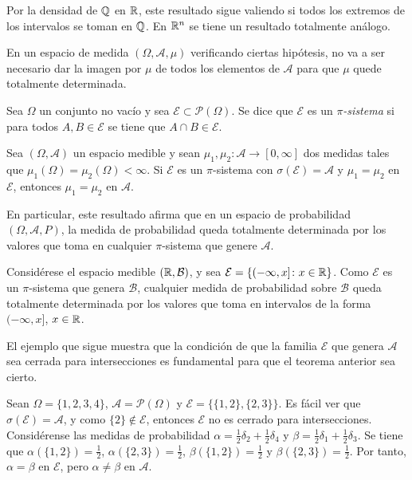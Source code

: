 \documentclass[a4paper, 11pt, extrafontsizes]{memoir}
\begin{document}
Por la densidad de $\mathbb Q$ en $\mathbb R$, este resultado sigue valiendo si todos los extremos de los intervalos se toman en $\mathbb Q$. En $\mathbb R^n$ se tiene un resultado totalmente análogo.

En un espacio de medida $(\Omega,\mathcal{A},\mu)$ verificando ciertas hipótesis, no va a ser necesario dar la imagen por $\mu$ de todos los elementos de $\mathcal{A}$ para que $\mu$ quede totalmente determinada.

\begin{definition}
    Sea $\Omega$ un conjunto no vacío y sea $\mathcal{E} \subset \mathcal{P}(\Omega)$. Se dice que $\mathcal{E}$ es un \emph{$\pi$-sistema} si para todos $A,B \in \mathcal{E}$ se tiene que $A \cap B \in \mathcal{E}$.
\end{definition}

\begin{theorem}
    Sea $(\Omega,\mathcal{A})$ un espacio medible y sean $\mu_1, \mu_2 \colon \mathcal{A} \to [0,\infty]$ dos medidas tales que $\mu_1(\Omega) = \mu_2(\Omega) < \infty$. Si $\mathcal{E}$ es un $\pi$-sistema con $\sigma(\mathcal{E}) = \mathcal{A}$ y $\mu_1=\mu_2$ en $\mathcal{E}$, entonces $\mu_1 = \mu_2$ en $\mathcal{A}$.
\end{theorem}

En particular, este resultado afirma que en un espacio de probabilidad $(\Omega,\mathcal{A},P)$, la medida de probabilidad queda totalmente determinada por los valores que toma en cualquier $\pi$-sistema que genere $\mathcal{A}$.

\begin{example}
Considérese el espacio medible $(\mathbb R,\mathcal{B})$, y sea $\mathcal{E} = \{(-\infty,x] \colon x \in \mathbb R\}$. Como $\mathcal{E}$ es un $\pi$-sistema que genera $\mathcal{B}$, cualquier medida de probabilidad sobre $\mathcal{B}$ queda totalmente determinada por los valores que toma en intervalos de la forma $(-\infty,x]$, $x \in \mathbb R$.
\end{example}

El ejemplo que sigue muestra que la condición de que la familia $\mathcal{E}$ que genera $\mathcal{A}$ sea cerrada para intersecciones es fundamental para que el teorema anterior sea cierto.

\begin{example}
    Sean $\Omega = \{1,2,3,4\}$, $\mathcal{A} = \mathcal{P}(\Omega)$ y $\mathcal{E} = \{\{1,2\},\{2,3\}\}$. Es fácil ver que $\sigma(\mathcal{E}) = \mathcal{A}$, y como $\{2\} \not\in \mathcal{E}$, entonces $\mathcal{E}$ no es cerrado para intersecciones. Considérense las medidas de probabilidad $\alpha = \frac{1}{2}\delta_2+\frac{1}{2}\delta_4$ y $\beta = \frac{1}{2}\delta_1 + \frac{1}{2}\delta_3$. Se tiene que
    $\alpha(\{1,2\}) = \frac{1}{2}$, $\alpha(\{2,3\}) = \frac{1}{2}$, $\beta(\{1,2\}) = \frac{1}{2}$ y $\beta(\{2,3\}) = \frac{1}{2}$. Por tanto, $\alpha = \beta$ en $\mathcal{E}$, pero $\alpha \neq \beta$ en $\mathcal{A}$.
\end{example}
\end{document}
